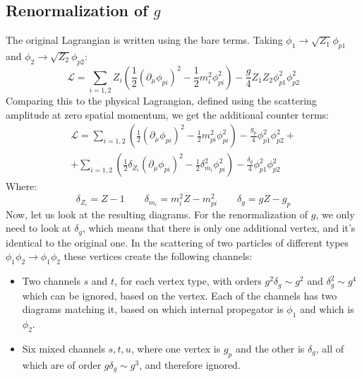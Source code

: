\documentclass{article}
\begin{document}
\subsection{Renormalization of $g$}
The original Lagrangian is written using the bare terms. Taking $\phi_1 \rightarrow \sqrt{Z_1}\phi_{p1}$ and $\phi_2 \rightarrow \sqrt{Z_2}\phi_{p2}$:
\begin{equation}
    \mathcal{L} = \sum_{i=1,2}Z_i\left(
        \frac{1}{2}\left(\partial_\mu\phi_{pi}\right)^2 - \frac{1}{2}m_i^2\phi_{pi}^2
    \right) - \frac{g}{4}Z_1Z_2\phi_{p1}^2\phi_{p2}^2
\end{equation}
Comparing this to the physical Lagrangian, defined using the scattering amplitude at zero spatial momentum, we get the additional counter terms:
\begin{equation}
\begin{gathered}
    \mathcal{L} = \sum_{i=1,2}\left(
        \frac{1}{2}\left(\partial_\mu\phi_{pi}\right)^2 - \frac{1}{2}m_{pi}^2\phi_{pi}^2
    \right) - \frac{g_p}{4}\phi_{p1}^2\phi_{p2}^2  + \\ + \sum_{i=1,2}\left(
        \frac{1}{2}\delta_{Z_i}\left(\partial_\mu\phi_{pi}\right)^2 - \frac{1}{2}\delta_{m_i}^2\phi_{pi}^2
    \right) - \frac{\delta_g}{4}\phi_{p1}^2\phi_{p2}^2
\end{gathered}
\end{equation}
Where:
\begin{equation}
    \delta_{Z_i} = Z - 1
    \qquad
    \delta_{m_i} = m_i^2 Z - m_{pi}^2
    \qquad
    \delta_g = gZ - g_p
\end{equation}
Now, let us look at the resulting diagrams. For the renormalization of $g$, we only need to look at $\delta_g$, which means that there is only one additional vertex, and it's identical to the original one.
\newline
In the scattering of two particles of different types $\phi_1\phi_2 \rightarrow \phi_1\phi_2$ these vertices create the following channels:
\begin{itemize}
    \item Two channels $s$ and $t$, for each vertex type, with orders $g^2\delta_g \sim g^2$ and $\delta_g^2 \sim g^4$ which can be ignored, based on the vertex. Each of the channels has two diagrams matching it, based on which internal propegator is $\phi_1$ and which is $\phi_2$.
    \item Six mixed channels $s, t, u$, where one vertex is $g_p$ and the other is $\delta_g$, all of which are of order $g\delta_g \sim g^3$, and therefore ignored.
\end{itemize}
\end{document}
